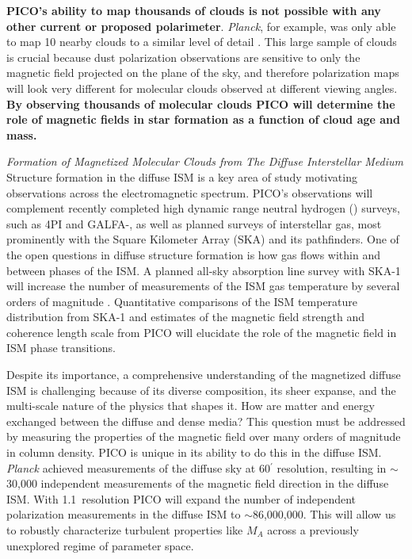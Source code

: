\documentclass[PICOReport.tex]{subfiles}
\begin{document}
{\bf PICO's ability to map thousands of clouds is not possible with any other current or proposed polarimeter}. {\em Planck}, for example, was only able to map 10 nearby clouds to a similar level of detail \citep{Planck:XXXV}. This large sample of clouds is crucial because dust polarization observations are sensitive to only the magnetic field projected on the plane of the sky, and therefore polarization maps will look very different for molecular clouds observed at different viewing angles.  {\bf By observing thousands of molecular clouds PICO will determine the role of magnetic fields in star formation as a function of cloud age and mass.}


{\em Formation of Magnetized Molecular Clouds from The Diffuse Interstellar Medium}\\
Structure formation in the diffuse ISM is a key area of study motivating observations across the electromagnetic spectrum. PICO's observations will complement recently completed high dynamic range neutral hydrogen (\HI) surveys, such as \HI4PI \citep{HI4PI:2016} and GALFA-\hi \citep{Peek:2018}, as well as planned surveys of interstellar gas, most prominently with the Square Kilometer Array (SKA) and its pathfinders. One of the open questions in diffuse structure formation is how gas flows within and between phases of the ISM. A planned all-sky absorption line survey with SKA-1 will increase the number of measurements of the ISM gas temperature by several orders of magnitude \citep{McClure-Griffiths2015}. Quantitative comparisons of the ISM temperature distribution from SKA-1 and estimates of the magnetic field strength and coherence length scale from PICO will elucidate the role of the magnetic field in ISM phase transitions.

Despite its importance, a comprehensive understanding of the magnetized diffuse ISM is challenging because of its diverse composition, its sheer expanse, and the multi-scale nature of the physics that shapes it. How are matter and energy exchanged between the diffuse and dense media? This question must be addressed by measuring the properties of the magnetic field over many orders of magnitude in column density. PICO is unique in its ability to do this in the diffuse ISM. \textit{Planck} achieved measurements of the diffuse sky at 60$^\prime$ resolution, resulting in $\sim$30,000 independent measurements of the magnetic field direction in the diffuse ISM.  With 1.1\arcmin~resolution PICO will expand the number of independent polarization measurements in the diffuse ISM to $\sim$86,000,000. This will allow us to robustly characterize turbulent properties like $M_A$ across a previously unexplored regime of parameter space. 
\end{document}
